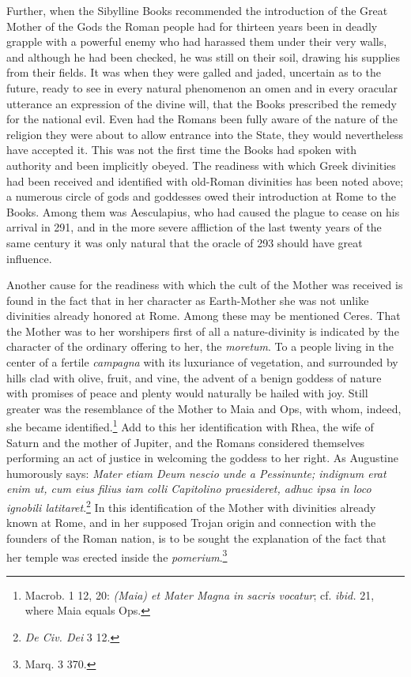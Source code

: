 \documentclass[a4paper, 11pt, oneside, polutonikogreek, english]{article}
\begin{document}
Further, when the Sibylline Books recommended the introduction of the Great Mother of the Gods the Roman people had for thirteen years been in deadly grapple with a powerful enemy who had harassed them under their very walls, and although he had been checked, he was still on their soil, drawing his supplies from their fields. It was when they were galled and jaded, uncertain as to the future, ready to see in every natural phenomenon an omen and in every oracular utterance an expression of the divine will, that the Books prescribed the remedy for the national evil. Even had the Romans been fully aware of the nature of the religion they were about to allow entrance into the State, they would nevertheless have accepted it. This was not the first time the Books had spoken with authority and been implicitly obeyed. The readiness with which Greek divinities had been received and identified with old-Roman divinities has been noted above; a numerous circle of gods and goddesses owed their introduction at Rome to the Books. Among them was Aesculapius, who had caused the plague to cease on his arrival in 291, and in the more severe affliction of the last twenty years of the same century it was only natural that the oracle of 293 should have great influence.

Another cause for the readiness with which the cult of the Mother was received is found in the fact that in her character as Earth-Mother she was not unlike divinities already honored at Rome. Among these may be mentioned Ceres. That the Mother was to her worshipers first of all a nature-divinity is indicated by the character of the ordinary offering to her, the \emph{moretum}. To a people living in the center of a fertile \emph{campagna} with its luxuriance of vegetation, and surrounded by hills clad with olive, fruit, and vine, the advent of a benign goddess of nature with promises of peace and plenty would naturally be hailed with joy. Still greater was the resemblance of the Mother to Maia and Ops, with whom, indeed, she became identified.\footnote{Macrob. 1 12, 20: \emph{(Maia) et Mater Magna in sacris vocatur}; cf. \emph{ibid.} 21, where Maia equals Ops.} Add to this her identification with Rhea, the wife of Saturn and the mother of Jupiter, and the Romans considered themselves performing an act of justice in welcoming the goddess to her right. As Augustine humorously says: \emph{Mater etiam Deum nescio unde a Pessinunte; indignum erat enim ut, cum eius filius iam colli Capitolino praesideret, adhuc ipsa in loco ignobili latitaret}.\footnote{\emph{De Civ. Dei} 3 12.} In this identification of the Mother with divinities already known at Rome, and in her supposed Trojan origin and connection with the founders of the Roman nation, is to be sought the explanation of the fact that her temple was erected inside the \emph{pomerium}.\footnote{Marq. 3 370.}
\end{document}
